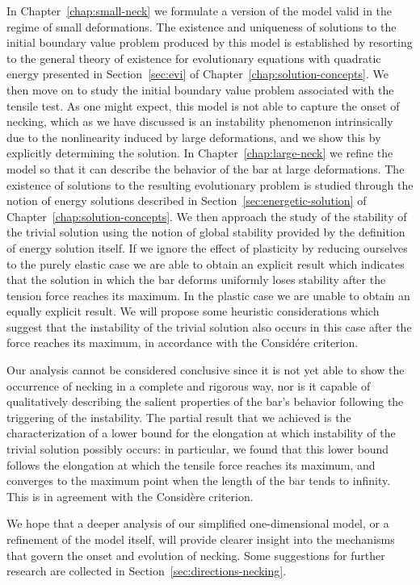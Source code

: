 \documentclass[a4paper,10pt,oneside]{amsbook}
\numberwithin{section}{chapter}
\numberwithin{equation}{chapter}
\theoremstyle{definition}
\begin{document}
In Chapter~\ref{chap:small-neck} we formulate a version of the model valid in the regime of small deformations. The existence and uniqueness of solutions to the initial boundary value problem produced by this model is established by resorting to the general theory of existence for evolutionary equations with quadratic energy presented in Section~\ref{sec:evi} of Chapter~\ref{chap:solution-concepts}. We then move on to study the initial boundary value problem associated with the tensile test. As one might expect, this model is not able to capture the onset of necking, which as we have discussed is an instability phenomenon intrinsically due to the nonlinearity induced by large deformations, and we show this by explicitly determining the solution. In Chapter~\ref{chap:large-neck} we refine the model so that it can describe the behavior of the bar at large deformations. The existence of solutions to the resulting evolutionary problem is studied through the notion of energy solutions described in Section~\ref{sec:energetic-solution} of Chapter~\ref{chap:solution-concepts}. We then approach the study of the stability of the trivial solution using the notion of global stability provided by the definition of energy solution itself. If we ignore the effect of plasticity by reducing ourselves to the purely elastic case we are able to obtain an explicit result which indicates that the solution in which the bar deforms uniformly loses stability after the tension force reaches its maximum. In the plastic case we are unable to obtain an equally explicit result. We will propose some heuristic considerations which suggest that the instability of the trivial solution also occurs in this case after the force reaches its maximum, in accordance with the Considére criterion.

Our analysis cannot be considered conclusive since it is not yet able to show the occurrence of necking in a complete and rigorous way, nor is it capable of qualitatively describing the salient properties of the bar's behavior following the triggering of the instability. The partial result that we achieved is the characterization of a lower bound for the elongation at which instability of the trivial solution possibly occurs: in particular, we found that this lower bound follows the elongation at which the tensile force reaches its maximum, and converges to the maximum point when the length of the bar tends to infinity. This is in agreement with the Considère criterion.

We hope that a deeper analysis of our simplified one-dimensional model, or a refinement of the model itself, will provide clearer insight into the mechanisms that govern the onset and evolution of necking. Some suggestions for further research are collected in Section~\ref{sec:directions-necking}.
\end{document}
